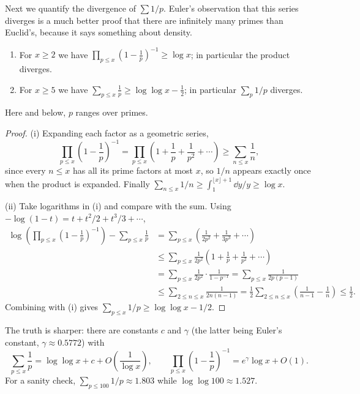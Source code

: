 Next we quantify the divergence of $\sum 1/p$. Euler's observation that this series diverges is a much better proof that there are infinitely many primes than Euclid's, because it says something about density.

\begin{theorem}[Mertens]\label{thm:mertens}
	\begin{enumerate}[label=(\roman*)]
		\item For $x \geq 2$ we have $\displaystyle\prod_{p \leq x}\left(1 - \frac1p\right)^{-1} \geq \log x$; in particular the product diverges.
		\item For $x \geq 5$ we have $\displaystyle\sum_{p \leq x}\frac1p \geq \log\log x - \frac12$; in particular $\sum_p 1/p$ diverges.
	\end{enumerate}
	Here and below, $p$ ranges over primes.
\end{theorem}
\begin{proof}
	(i) Expanding each factor as a geometric series,
	$$
	\prod_{p \leq x}\left(1 - \frac1p\right)^{-1} = \prod_{p \leq x}\left(1 + \frac1p + \frac1{p^2} + \cdots\right) \geq \sum_{n \leq x}\frac1n,
	$$
	since every $n \leq x$ has all its prime factors at most $x$, so $1/n$ appears exactly once when the product is expanded. Finally $\sum_{n \leq x}1/n \geq \int_1^{\lfloor x\rfloor + 1}\dd y/y \geq \log x$.

	(ii) Take logarithms in (i) and compare with the sum. Using $-\log(1 - t) = t + t^2/2 + t^3/3 + \cdots$,
	\begin{align*}
		\log\left(\prod_{p \leq x}\left(1 - \frac1p\right)^{-1}\right) - \sum_{p\leq x}\frac1p &= \sum_{p \leq x}\left(\frac1{2p^2} + \frac1{3p^3} + \cdots\right) \\
		&\leq \sum_{p \leq x}\frac1{2p^2}\left(1 + \frac1p + \frac1{p^2} + \cdots\right) \\
		&= \sum_{p \leq x}\frac{1}{2p^2}\cdot\frac{1}{1 - p^{-1}} = \sum_{p \leq x}\frac1{2p(p-1)} \\
		&\leq \sum_{2 \leq n \leq x}\frac1{2n(n-1)} = \frac12\sum_{2\leq n \leq x}\left(\frac1{n-1} - \frac1n\right) \leq \frac12.
	\end{align*}
	Combining with (i) gives $\sum_{p \leq x}1/p \geq \log\log x - 1/2$.
\end{proof}

\begin{remark}
	The truth is sharper: there are constants $c$ and $\gamma$ (the latter being Euler's constant, $\gamma \approx 0.5772$) with
	$$
	\sum_{p \leq x}\frac1p = \log\log x + c + O\!\left(\frac1{\log x}\right), \qquad \prod_{p\leq x}\left(1 - \frac1p\right)^{-1} = e^\gamma \log x + O(1).
	$$
	For a sanity check, $\sum_{p \leq 100}1/p \approx 1.803$ while $\log\log 100 \approx 1.527$.
\end{remark}

